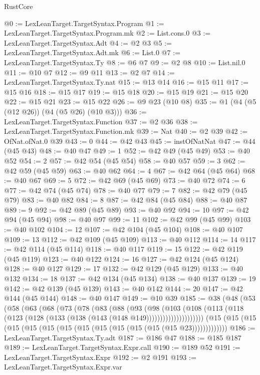 \begin{lexlean}{RustCore}
\begin{coremodule}
@0 := LexLeanTarget.TargetSyntax.Program
@1 := LexLeanTarget.TargetSyntax.Program.mk
@2 := List.cons.{0}
@3 := LexLeanTarget.TargetSyntax.Adt
@4 := @2 @3
@5 := LexLeanTarget.TargetSyntax.Adt.mk
@6 := List.{0}
@7 := LexLeanTarget.TargetSyntax.Ty
@8 := @6 @7
@9 := @2 @8
@10 := List.nil.{0}
@11 := @10 @7
@12 := @9 @11
@13 := @2 @7
@14 := LexLeanTarget.TargetSyntax.Ty.nat
@15 := @13 @14
@16 := @15 @11
@17 := @15 @16
@18 := @15 @17
@19 := @15 @18
@20 := @15 @19
@21 := @15 @20
@22 := @15 @21
@23 := @15 @22
@26 := @9 @23 (@10 @8)
@35 := @1 (@4 (@5 (@12 @26)) (@4 (@5 @26) (@10 @3)))
@36 := LexLeanTarget.TargetSyntax.Function
@37 := @2 @36
@38 := LexLeanTarget.TargetSyntax.Function.mk
@39 := Nat
@40 := @2 @39
@42 := OfNat.ofNat.{0} @39
@43 := 0
@44 := @42 @43
@45 := instOfNatNat
@47 := @44 (@45 @43)
@48 := @40 @47
@49 := 1
@52 := @42 @49 (@45 @49)
@53 := @40 @52
@54 := 2
@57 := @42 @54 (@45 @54)
@58 := @40 @57
@59 := 3
@62 := @42 @59 (@45 @59)
@63 := @40 @62
@64 := 4
@67 := @42 @64 (@45 @64)
@68 := @40 @67
@69 := 5
@72 := @42 @69 (@45 @69)
@73 := @40 @72
@74 := 6
@77 := @42 @74 (@45 @74)
@78 := @40 @77
@79 := 7
@82 := @42 @79 (@45 @79)
@83 := @40 @82
@84 := 8
@87 := @42 @84 (@45 @84)
@88 := @40 @87
@89 := 9
@92 := @42 @89 (@45 @89)
@93 := @40 @92
@94 := 10
@97 := @42 @94 (@45 @94)
@98 := @40 @97
@99 := 11
@102 := @42 @99 (@45 @99)
@103 := @40 @102
@104 := 12
@107 := @42 @104 (@45 @104)
@108 := @40 @107
@109 := 13
@112 := @42 @109 (@45 @109)
@113 := @40 @112
@114 := 14
@117 := @42 @114 (@45 @114)
@118 := @40 @117
@119 := 15
@122 := @42 @119 (@45 @119)
@123 := @40 @122
@124 := 16
@127 := @42 @124 (@45 @124)
@128 := @40 @127
@129 := 17
@132 := @42 @129 (@45 @129)
@133 := @40 @132
@134 := 18
@137 := @42 @134 (@45 @134)
@138 := @40 @137
@139 := 19
@142 := @42 @139 (@45 @139)
@143 := @40 @142
@144 := 20
@147 := @42 @144 (@45 @144)
@148 := @40 @147
@149 := @10 @39
@185 := @38
    (@48
      (@53
        (@58
          (@63
            (@68
              (@73
                (@78
                  (@83
                    (@88
                      (@93
                        (@98
                          (@103
                            (@108
                              (@113
                                (@118 (@123 (@128 (@133 (@138 (@143 (@148 @149)))))))))))))))))))))
    (@15 (@15 (@15 (@15 (@15 (@15 (@15 (@15 (@15 (@15 (@15 (@15 (@15 @23)))))))))))))
@186 := LexLeanTarget.TargetSyntax.Ty.adt
@187 := @186 @47
@188 := @185 @187
@189 := LexLeanTarget.TargetSyntax.Expr.call
@190 := @189 @52
@191 := LexLeanTarget.TargetSyntax.Expr
@192 := @2 @191
@193 := LexLeanTarget.TargetSyntax.Expr.var

\end{coremodule}
\end{lexlean}
